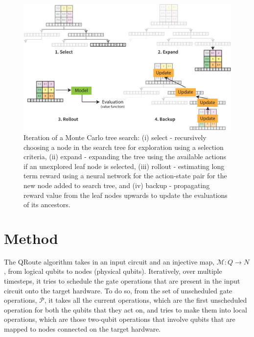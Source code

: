 \begin{figure}[ht]
    \centering
    \includegraphics[width=\linewidth]{figures/qroute/Search.pdf}
    \caption[Visualization of steps in Monte Carlo Tree Search]{
        Iteration of a Monte Carlo tree search: (i) select - recursively choosing a node in the search tree for exploration using a selection criteria, (ii) expand - expanding the tree using the available actions if an unexplored leaf node is selected, (iii) rollout - estimating long term reward using a neural network for the action-state pair for the new node added to search tree, and (iv) backup - propagating reward value from the leaf nodes upwards to update the evaluations of its ancestors.}
    \label{fig:mcts-explainer}
\end{figure}


\newtheorem{defn}{Definition}[section]

\section{\label{sec:method}Method}

The QRoute algorithm takes in an input circuit and an injective map, $\mathcal{M}: Q \rightarrow N$, from logical qubits to nodes (physical qubits). Iteratively, over multiple timesteps, it tries to schedule the gate operations that are present in the input circuit onto the target hardware. To do so, from the set of unscheduled gate operations, $\mathcal{P}$, it takes all the current operations, which are the first unscheduled operation for both the qubits that they act on, and tries to make them into local operations, which are those two-qubit operations that involve qubits that are mapped to nodes connected on the target hardware.

